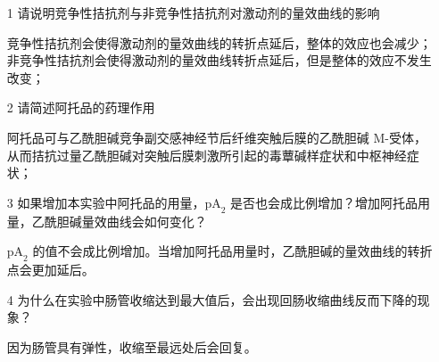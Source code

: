 \documentclass[UTF8]{ctexart}
\begin{document}
\begin{itemize}
    \item [1] 请说明竞争性拮抗剂与非竞争性拮抗剂对激动剂的量效曲线的影响
    
        竞争性拮抗剂会使得激动剂的量效曲线的转折点延后，整体的效应也会减少；非竞争性拮抗剂会使得激动剂的量效曲线转折点延后，但是整体的效应不发生改变；
    
    \item [2] 请简述阿托品的药理作用
    
        阿托品可与乙酰胆碱竞争副交感神经节后纤维突触后膜的乙酰胆碱 M-受体，从而拮抗过量乙酰胆碱对突触后膜刺激所引起的毒蕈碱样症状和中枢神经症状；

    \item [3] 如果增加本实验中阿托品的用量，$\text{pA}_2$ 是否也会成比例增加？增加阿托品用量，乙酰胆碱量效曲线会如何变化？
    
        $\text{pA}_2$ 的值不会成比例增加。当增加阿托品用量时，乙酰胆碱的量效曲线的转折点会更加延后。

    \item [4] 为什么在实验中肠管收缩达到最大值后，会出现回肠收缩曲线反而下降的现象？
    
        因为肠管具有弹性，收缩至最远处后会回复。
\end{itemize}
\end{document}
